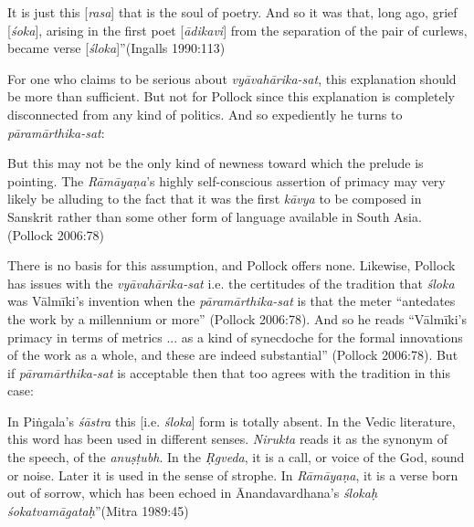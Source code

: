 \begin{myquote}
It is just this [\textsl{rasa}] that is the soul of poetry. And so it was that, long ago, grief [\textsl{śoka}], arising in the first poet [\textsl{ādikavi}] from the separation of the pair of curlews, became verse [\textsl{śloka}]''\hfill (Ingalls 1990:113)
\end{myquote}

For one who claims to be serious about \textsl{vyāvahārika-sat}, this explanation should be more than sufficient. But not for Pollock since this explanation is completely disconnected from any kind of politics. And so expediently he turns to \textsl{pāramārthika-sat}:  
\vskip 1pt

\begin{myquote}
But this may not be the only kind of newness toward which the prelude is pointing. The \textsl{Rāmāyaṇa}'s highly self-conscious assertion of primacy may very likely be alluding to the fact that it was the first \textsl{kāvya} to be composed in Sanskrit rather than some other form of language available in South Asia. 
\hfill (Pollock 2006:78)
\end{myquote}
\vskip 1pt

There is no basis for this assumption, and Pollock offers none. Likewise, Pollock has issues with the \textsl{vyāvahārika-sat} i.e. the certitudes of the tradition that \textsl{śloka} was Vālmīki's invention when the \textsl{pāramārthika-sat} is that the meter ``antedates the work by a millennium or more'' (Pollock 2006:78). And so he reads ``Vālmīki’s primacy in terms of metrics ... as a kind of synecdoche for the formal innovations of the work as a whole, and these are indeed substantial” (Pollock 2006:78). But if \textsl{pāramārthika-sat} is acceptable then that too agrees with the tradition in this case:
\vskip 1pt

\begin{myquote}
In Piṅgala's \textsl{śāstra} this [i.e. \textsl{śloka}] form is totally absent. In the Vedic literature, this word has been used in different senses. \textsl{Nirukta} reads it as the synonym of the speech, of the \textsl{anuṣṭubh}. In the \textsl{Ṛgveda}, it is a call, or voice of the God, sound or noise. Later it is used in the sense of strophe. In \textsl{Rāmāyaṇa}, it is a verse born out of sorrow, which has been echoed in Ānandavardhana's \textsl{ślokaḥ śokatvamāgataḥ}''\hfill (Mitra 1989:45)
\end{myquote}
\vskip 1pt

